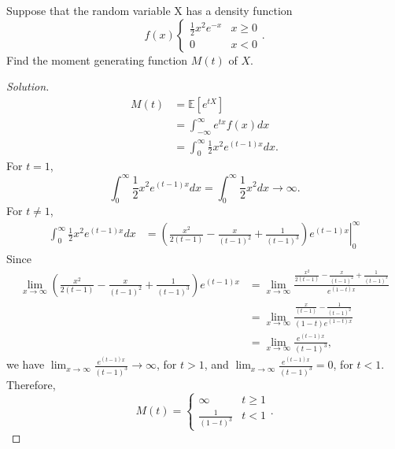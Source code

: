 \documentclass[addpoints, 11pt]{exam}
\newcommand*{\E}{\mathds{E}}
\newenvironment{question}[1]{\smallskip\noindent\color{crimson}{\bf Question #1.}}{}
\begin{document}
\newpage

\begin{question}{3}
     Suppose that the random variable X has a density function
     \[
        f(x) \begin{cases}
            \frac{1}{2}x^2e^{-x} & x \geq 0 \\
            0 & x < 0
        \end{cases}.
     \]
     Find the moment generating function $M(t)$ of $X$.
\end{question}

\begin{proof}[Solution]
    \begin{align*}
        M(t)
        &= \E[e^{tX}] \\
        &= \int^{\infty}_{-\infty} e^{tx}f(x) dx \\
        &= \int^{\infty}_{0} \frac{1}{2}x^2e^{(t-1)x} dx.
    \end{align*}
    For $t = 1$,
    \[
        \int^{\infty}_{0} \frac{1}{2}x^2e^{(t-1)x} dx
        = \int^{\infty}_{0} \frac{1}{2}x^2 dx \rightarrow \infty.
    \]
    For $t \neq 1$,
    \begin{align*}
        \int^{\infty}_{0} \frac{1}{2}x^2e^{(t-1)x} dx
        &= \left.\left(\frac{x^2}{2(t - 1)} - \frac{x}{(t - 1)^2} + \frac{1}{(t - 1)^3} \right)e^{(t - 1)x}\right|^{\infty}_0
    \end{align*}
    Since
    \begin{align*}
        \lim_{x\to\infty} \left(\frac{x^2}{2(t - 1)} - \frac{x}{(t - 1)^2} + \frac{1}{(t - 1)^3} \right)e^{(t - 1)x}
        &= \lim_{x\to\infty} \frac{\frac{x^2}{2(t - 1)} - \frac{x}{(t - 1)^2} + \frac{1}{(t - 1)^3}}{e^{(1 - t)x}} \\
        &= \lim_{x\to\infty} \frac{\frac{x}{(t - 1)} - \frac{1}{(t - 1)^2}}{(1 - t)e^{(1 - t)x}} \\
        &= \lim_{x\to\infty} \frac{e^{(t - 1)x}}{(t - 1)^3},
    \end{align*}
    we have $\lim_{x\to\infty} \frac{e^{(t - 1)x}}{(t - 1)^3} \rightarrow \infty$, for $t > 1$, and $\lim_{x\to\infty} \frac{e^{(t - 1)x}}{(t - 1)^3} = 0$, for $t < 1$. Therefore, 
    \[
        M(t) = \begin{cases}
            \infty & t \geq 1 \\
            \frac{1}{(1 - t)^3} & t < 1
        \end{cases}.
    \]
\end{proof}

\newpage
\end{document}
